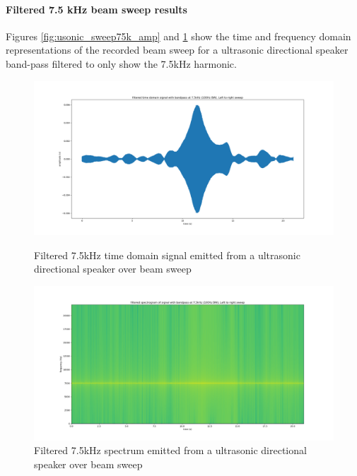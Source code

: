 \paragraph{Filtered 7.5 kHz beam sweep results}
Figures \ref{fig:usonic_sweep75k_amp} and \ref{fig:usonic_sweep75k_spectro} show the time and frequency domain representations of the recorded beam sweep for a ultrasonic directional speaker band-pass filtered to only show the 7.5kHz harmonic. 
\begin{figure}[ht!]
    \centering
    \begin{minipage}{0.49\textwidth}
        \centering
        \includegraphics[width=\textwidth]{Figures/Testing/BeamSweep/Ultrasonic_sqr_am/7_5k_amp_sweep.png}
        \caption{Filtered 7.5kHz time domain signal emitted from a ultrasonic directional speaker over beam sweep}
        \label{fig:usonic_sweep75k_amp}
    \end{minipage}\hfill
    \begin{minipage}{0.49\textwidth}
        \centering
        \includegraphics[width=\textwidth]{Figures/Testing/BeamSweep/Ultrasonic_sqr_am/7_5k_freq_sweep.png}
        \caption{Filtered 7.5kHz spectrum emitted from a ultrasonic directional speaker over beam sweep}
        \label{fig:usonic_sweep75k_spectro}
    \end{minipage}
\end{figure}
